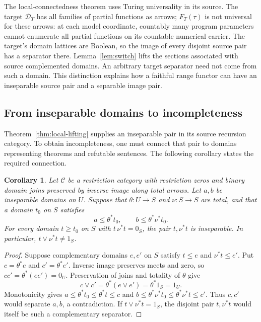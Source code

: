 \documentclass[11pt]{article}
\newtheorem{corollary}[theorem]{Corollary}
\begin{document}
The local-connectedness theorem uses Turing universality in its source.
The target $\mathcal D_T$ has all families of partial functions as arrows;
$F_T(\tau)$ is not universal for these arrows: at each model coordinate,
countably many program parameters cannot enumerate all partial functions
on its countable numerical carrier. The target's domain lattices are
Boolean, so the image of every disjoint source pair has a separator
there. Lemma~\ref{lem:switch} lifts the sections associated with source
complemented domains. An arbitrary target separator need not come from
such a domain. This distinction explains how a faithful range functor
can have an inseparable source pair and a separable image pair.

\subsection{From inseparable domains to incompleteness}

Theorem~\ref{thm:local-lifting} supplies an inseparable pair in its
source recursion category. To obtain incompleteness, one must connect
that pair to domains representing theorems and refutable sentences.
The following corollary states the required connection.

\begin{corollary}\label{cor:domain-incompleteness}
Let $\mathcal C$ be a restriction category with restriction zeros and
binary domain joins preserved by inverse image along total arrows.
Let $a,b$ be inseparable domains on $U$. Suppose that
$\theta:U\to S$ and $\nu:S\to S$ are total, and that a domain $t_0$
on $S$ satisfies
\[
 a\le\theta^*t_0,\qquad b\le\theta^*\nu^*t_0.
\]
For every domain $t\ge t_0$ on $S$ with $t\,\nu^*t=0_S$,
the pair $t,\nu^*t$ is inseparable. In particular,
$t\vee\nu^*t\ne1_S$.
\end{corollary}
\begin{proof}
Suppose complementary domains $e,e'$ on $S$ satisfy
$t\le e$ and $\nu^*t\le e'$. Put
$c=\theta^*e$ and $c'=\theta^*e'$. Inverse image preserves
meets and zero, so $cc'=\theta^*(ee')=0_U$.
Preservation of joins and totality of $\theta$ give
\[
 c\vee c'=\theta^*(e\vee e')=\theta^*1_S=1_U.
\]
Monotonicity gives
$a\le\theta^*t_0\le\theta^*t\le c$ and
$b\le\theta^*\nu^*t_0\le\theta^*\nu^*t\le c'$.
Thus $c,c'$ would separate $a,b$, a contradiction.
If $t\vee\nu^*t=1_S$, the disjoint pair $t,\nu^*t$ would
itself be such a complementary separator.
\end{proof}
\end{document}
